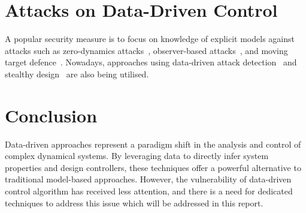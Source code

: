 \section{Attacks on Data-Driven Control}
A popular security measure is to focus on knowledge of explicit models against attacks such as zero-dynamics attacks~\cite{Pasqualetti2015Control}, observer-based attacks~\cite{Giraldo2018A}, and moving target defence~\cite{Griffioen2020Moving}.
Nowadays, approaches using data-driven attack detection~\cite{Krishnan2020Data} and stealthy design~\cite{Alisic2021Data,Alisic2023Model} are also being utilised.
\clearpage
\section{Conclusion}
Data-driven approaches represent a paradigm shift in the analysis and control of complex dynamical systems. By leveraging data to directly infer system properties and design controllers, these techniques offer a powerful alternative to traditional model-based approaches. 
However, the vulnerability of data-driven control algorithm has received less attention, and there is a need for dedicated techniques to address this issue which will be addressed in this report.
